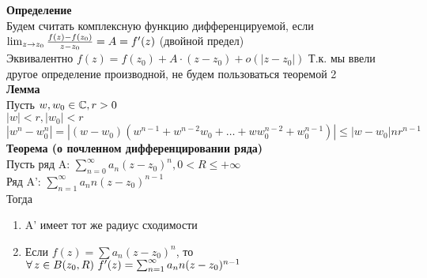 \documentclass[12pt]{article}
\begin{document}
\textbf{Определение}\\
Будем считать комплексную функцию дифференцируемой, если $\lim_{z\rightarrow z_0} \frac{f(z)-f(z_0)}{z-z_0} = A = f'(z)$ (двойной предел)\\
Эквивалентно $f(z)=f(z_0) + A\cdot (z-z_0) + o(|z-z_0|)$
Т.к. мы ввели другое определение производной, не будем пользоваться теоремой 2\\
\textbf{Лемма}\\
Пусть $w, w_0 \in \mathbb{C}, r > 0$\\
$|w| < r, |w_0| < r$\\
$|w^n-w_0^n| = |(w-w_0)(w^{n-1} + w^{n-2}w_0 + \ldots + ww_0^{n-2}+w_0^{n-1})|\leq |w-w_0|nr^{n-1}$\\
\textbf{Теорема (о почленном дифференцировании ряда)}\\
Пусть ряд A: $\sum_{n=0}^{\infty} a_n(z-z_0)^n, 0 < R \leq +\infty$\\
Ряд A': $\sum_{n=1}^{\infty} a_n n (z-z_0)^{n-1}$\\
Тогда\begin{enumerate}
    \item A' имеет тот же радиус сходимости
    \item Если $f(z) = \sum a_n (z-z_0)^n$, то $\fall z \in B(z_0, R)\ f'(z)=\sum_{n=1}^\infty a_n n (z-z_0)^{n-1}$
\end{enumerate}
\end{document}

